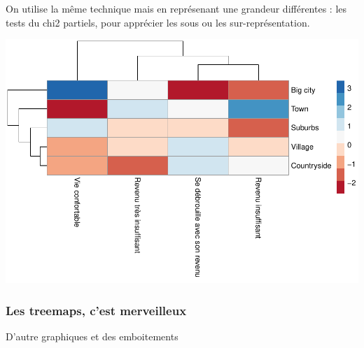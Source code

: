 \documentclass[
]{book}
\newenvironment{Shaded}{\begin{snugshade}}{\end{snugshade}}
\newcommand{\AttributeTok}[1]{\textcolor[rgb]{0.77,0.63,0.00}{#1}}
\newcommand{\DecValTok}[1]{\textcolor[rgb]{0.00,0.00,0.81}{#1}}
\newcommand{\FunctionTok}[1]{\textcolor[rgb]{0.00,0.00,0.00}{#1}}
\newcommand{\NormalTok}[1]{#1}
\newcommand{\OtherTok}[1]{\textcolor[rgb]{0.56,0.35,0.01}{#1}}
\newcommand{\SpecialCharTok}[1]{\textcolor[rgb]{0.00,0.00,0.00}{#1}}
\newcommand{\StringTok}[1]{\textcolor[rgb]{0.31,0.60,0.02}{#1}}
\begin{document}
On utilise la même technique mais en représenant une grandeur différentes : les tests du chi2 partiels, pour apprécier les sous ou les sur-représentation.

\begin{Shaded}
\end{Shaded}

\includegraphics{bookdown-demo_files/figure-latex/0430-1.pdf}

\hypertarget{les-treemaps-cest-merveilleux}{%
\subsubsection{Les treemaps, c'est merveilleux}\label{les-treemaps-cest-merveilleux}}

D'autre graphiques et des emboitements
\end{document}

